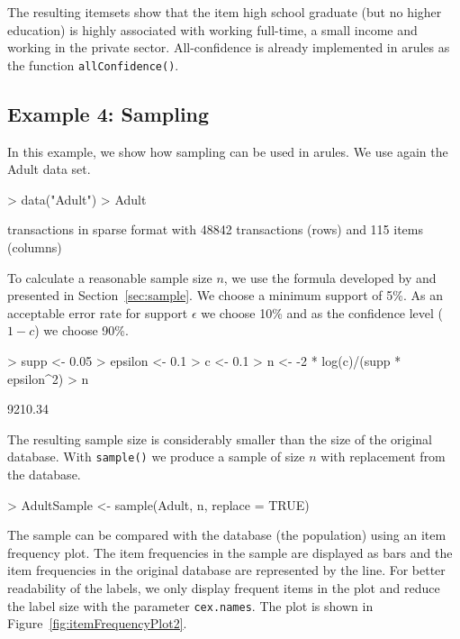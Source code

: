 \documentclass[10pt,a4paper]{article}
\newcommand{\strong}[1]{{\normalfont\fontseries{b}\selectfont #1}}
\newcommand{\func}[1]{\mbox{\texttt{#1()}}}
\newcommand{\code}[1]{\mbox{\texttt{#1}}}
\newcommand{\pkg}[1]{\strong{#1}}
\begin{document}
The resulting itemsets show that the item high school graduate (but no
higher education) is highly associated with working full-time, a small
income and working in the private sector.  All-confidence is already
implemented in \pkg{arules} as the function \func{allConfidence}.

\subsection{Example 4: Sampling}
In this example, we show how sampling
can be used in \pkg{arules}. We use again the Adult data set.

\begin{Schunk}
\begin{Sinput}
> data("Adult")
> Adult
\end{Sinput}
\begin{Soutput}
transactions in sparse format with
 48842 transactions (rows) and
 115 items (columns)
\end{Soutput}
\end{Schunk}

To calculate a reasonable sample size $n$, we use the formula developed
by \cite{arules:Zaki+Parthasarathy+Li+Ogihara:1997} and presented in 
Section~\ref{sec:sample}. We choose a minimum support of 5\%.
As an acceptable error rate for support $\epsilon$ we choose 10\% and
as the confidence level ($1-c$) we choose 90\%. 

\begin{Schunk}
\begin{Sinput}
> supp <- 0.05
> epsilon <- 0.1
> c <- 0.1
> n <- -2 * log(c)/(supp * epsilon^2)
> n
\end{Sinput}
\begin{Soutput}
[1] 9210.34
\end{Soutput}
\end{Schunk}

The resulting sample size is considerably smaller than the size of the
original database.
With \func{sample} we produce a sample of size $n$ with replacement from
the database.


\begin{Schunk}
\begin{Sinput}
> AdultSample <- sample(Adult, n, replace = TRUE)
\end{Sinput}
\end{Schunk}

The sample can be compared with the 
database (the population) using an item frequency plot.
The item frequencies in the sample are displayed as bars and the
item frequencies in the original database are represented by 
the line. For better readability of the labels, we
only display frequent items in the plot and reduce
the label size with the parameter \code{cex.names}.
The plot is shown in Figure~\ref{fig:itemFrequencyPlot2}.
\end{document}
